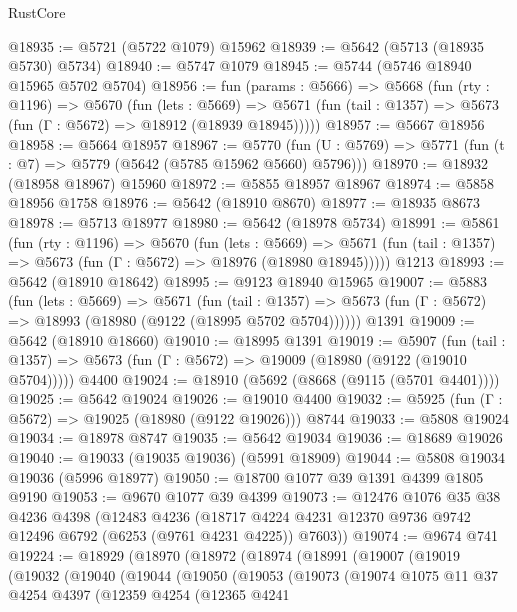 \begin{lexlean}{RustCore}
\begin{coremodule}
@18935 := @5721 (@5722 @1079) @15962
@18939 := @5642 (@5713 (@18935 @5730) @5734)
@18940 := @5747 @1079
@18945 := @5744 (@5746 @18940 @15965 @5702 @5704)
@18956 := fun (params : @5666) =>
  @5668
    (fun (rty : @1196) =>
    @5670
      (fun (lets : @5669) =>
      @5671 (fun (tail : @1357) => @5673 (fun (Γ : @5672) => @18912 (@18939 @18945)))))
@18957 := @5667 @18956
@18958 := @5664 @18957
@18967 := @5770
    (fun (U : @5769) => @5771 (fun (t : @7) => @5779 (@5642 (@5785 @15962 @5660) @5796)))
@18970 := @18932 (@18958 @18967) @15960
@18972 := @5855 @18957 @18967
@18974 := @5858 @18956 @1758
@18976 := @5642 (@18910 @8670)
@18977 := @18935 @8673
@18978 := @5713 @18977
@18980 := @5642 (@18978 @5734)
@18991 := @5861
    (fun (rty : @1196) =>
    @5670
      (fun (lets : @5669) =>
      @5671 (fun (tail : @1357) => @5673 (fun (Γ : @5672) => @18976 (@18980 @18945)))))
    @1213
@18993 := @5642 (@18910 @18642)
@18995 := @9123 @18940 @15965
@19007 := @5883
    (fun (lets : @5669) =>
    @5671
      (fun (tail : @1357) =>
      @5673 (fun (Γ : @5672) => @18993 (@18980 (@9122 (@18995 @5702 @5704))))))
    @1391
@19009 := @5642 (@18910 @18660)
@19010 := @18995 @1391
@19019 := @5907
    (fun (tail : @1357) => @5673 (fun (Γ : @5672) => @19009 (@18980 (@9122 (@19010 @5704)))))
    @4400
@19024 := @18910 (@5692 (@8668 (@9115 (@5701 @4401))))
@19025 := @5642 @19024
@19026 := @19010 @4400
@19032 := @5925 (fun (Γ : @5672) => @19025 (@18980 (@9122 @19026))) @8744
@19033 := @5808 @19024
@19034 := @18978 @8747
@19035 := @5642 @19034
@19036 := @18689 @19026
@19040 := @19033 (@19035 @19036) (@5991 @18909)
@19044 := @5808 @19034 @19036 (@5996 @18977)
@19050 := @18700 @1077 @39 @1391 @4399 @1805 @9190
@19053 := @9670 @1077 @39 @4399
@19073 := @12476
    @1076
    @35
    @38
    @4236
    @4398
    (@12483
      @4236
      (@18717 @4224 @4231 @12370 @9736 @9742 @12496 @6792 (@6253 (@9761 @4231 @4225)) @7603))
@19074 := @9674 @741
@19224 := @18929
    (@18970
      (@18972
        (@18974
          (@18991
            (@19007
              (@19019
                (@19032
                  (@19040
                    (@19044
                      (@19050
                        (@19053
                          (@19073
                            (@19074
                              @1075
                              @11
                              @37
                              @4254
                              @4397
                              (@12359
                                @4254
                                (@12365
                                  @4241

\end{coremodule}
\end{lexlean}
